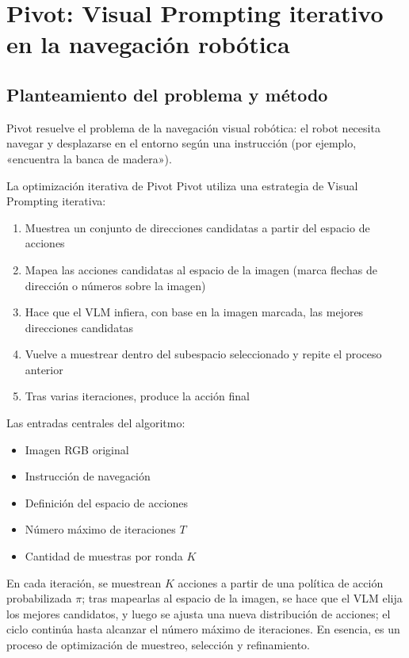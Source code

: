\section{Pivot: Visual Prompting iterativo en la navegación robótica}

\subsection{Planteamiento del problema y método}

Pivot resuelve el problema de la navegación visual robótica: el robot necesita navegar y desplazarse en el entorno según una instrucción (por ejemplo, «encuentra la banca de madera»).

\begin{importantbox}{La optimización iterativa de Pivot}
Pivot utiliza una estrategia de Visual Prompting iterativa:
\begin{enumerate}
    \item Muestrea un conjunto de direcciones candidatas a partir del espacio de acciones
    \item Mapea las acciones candidatas al espacio de la imagen (marca flechas de dirección o números sobre la imagen)
    \item Hace que el VLM infiera, con base en la imagen marcada, las mejores direcciones candidatas
    \item Vuelve a muestrear dentro del subespacio seleccionado y repite el proceso anterior
    \item Tras varias iteraciones, produce la acción final
\end{enumerate}
\end{importantbox}

Las entradas centrales del algoritmo:
\begin{itemize}
    \item Imagen RGB original
    \item Instrucción de navegación
    \item Definición del espacio de acciones
    \item Número máximo de iteraciones $T$
    \item Cantidad de muestras por ronda $K$
\end{itemize}

En cada iteración, se muestrean $K$ acciones a partir de una política de acción probabilizada $\pi$; tras mapearlas al espacio de la imagen, se hace que el VLM elija los mejores candidatos, y luego se ajusta una nueva distribución de acciones; el ciclo continúa hasta alcanzar el número máximo de iteraciones. En esencia, es un proceso de optimización de muestreo, selección y refinamiento.


